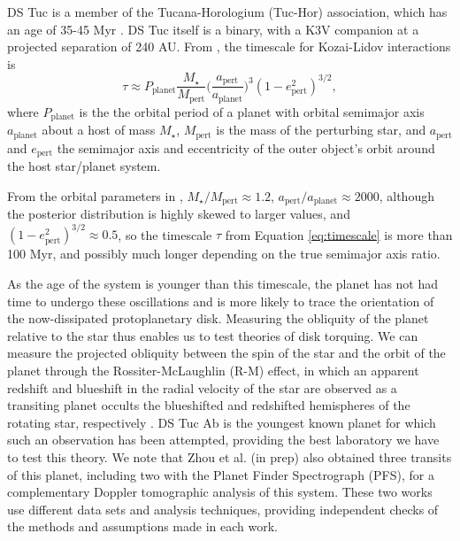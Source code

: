 \documentclass[twocolumn]{aastex63}
\begin{document}
DS Tuc is a member of the Tucana-Horologium (Tuc-Hor) association, which has an age of 35-45 Myr \citep{Bell15, Crundall19}. 
DS Tuc itself is a binary, with a K3V companion at a projected separation of 240 AU. 
From \citet{Holman97}, the timescale for Kozai-Lidov interactions is
\begin{equation}
    \tau \approx P_\textrm{planet} \frac{M_\star}{M_\textrm{pert}} \bigg(\frac{a_\textrm{pert}}{a_\textrm{planet}}\bigg)^3 (1-e^2_\textrm{pert})^{3/2},
\label{eq:timescale}
\end{equation}
where $P_\textrm{planet}$ is the the orbital period of a planet with orbital semimajor axis  $a_\textrm{planet}$ about a host of mass $M_\star$, $M_\textrm{pert}$ is the
mass of the perturbing star, and $a_\textrm{pert}$ and $e_\textrm{pert}$ the semimajor axis and eccentricity of the outer object's orbit around the host star/planet system.


From the orbital parameters in \citet{Newton19}, ${M_\star}/{M_\textrm{pert}} \approx 1.2$, ${a_\textrm{pert}}/{a_\textrm{planet}} \approx 2000$, although the posterior distribution is highly skewed to larger values, and $(1-e^2_\textrm{pert})^{3/2} \approx 0.5$, so the timescale $\tau$ from Equation \ref{eq:timescale} is more than 100 Myr, and possibly much longer depending on the true semimajor axis ratio. 


As the age of the system is younger than this timescale, the planet has not had time to undergo these oscillations and is more likely to trace the orientation of the now-dissipated protoplanetary disk. 
Measuring the obliquity of the planet relative to the star thus enables us to test theories of disk torquing.
We can measure the projected obliquity between the spin of the star and the orbit of the planet through the Rossiter-McLaughlin (R-M) effect, in which an apparent redshift and blueshift in the radial velocity of the star are observed as a transiting planet occults the blueshifted and redshifted hemispheres of the rotating star, respectively \citep{Rossiter24, McLaughlin24}.
DS Tuc Ab is the youngest known planet for which such an observation has been attempted, providing the best laboratory we have to test this theory.
We note that Zhou et al. (in prep) also obtained three transits of this planet, including two with the Planet Finder Spectrograph (PFS), for a complementary Doppler tomographic analysis of this system. These two works use different data sets and analysis techniques, providing independent checks of the methods and assumptions made in each work.
\end{document}
